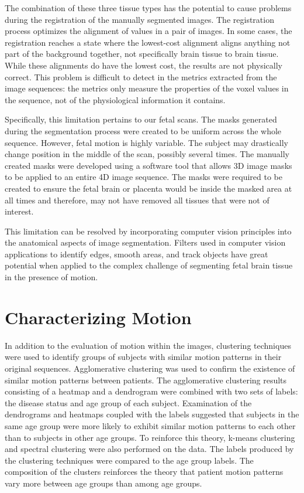 The combination of these three tissue types has the potential to cause problems during the registration of the manually segmented images. The registration process optimizes the alignment of values in a pair of images. In some cases, the registration reaches a state where the lowest-cost alignment aligns anything not part of the background together, not specifically brain tissue to brain tissue. While these alignments do have the lowest cost, the results are not physically correct. This problem is difficult to detect in the metrics extracted from the image sequences: the metrics only measure the properties of the voxel values in the sequence, not of the physiological information it contains. 

Specifically, this limitation pertains to our fetal scans. The masks generated during the segmentation process were created to be uniform across the whole sequence. However, fetal motion is highly variable. The subject may drastically change position in the middle of the scan, possibly several times. The manually created masks were developed using a software tool that allows 3D image masks to be applied to an entire 4D image sequence. The masks were required to be created to ensure the fetal brain or placenta would be inside the masked area at all times and therefore, may not have removed all tissues that were not of interest.

This limitation can be resolved by incorporating computer vision principles into the anatomical aspects of image segmentation. Filters used in computer vision applications to identify edges, smooth areas, and track objects have great potential when applied to the complex challenge of segmenting fetal brain tissue in the presence of motion.

\section{Characterizing Motion}

In addition to the evaluation of motion within the images, clustering techniques were used to identify groups of subjects with similar motion patterns in their original sequences. Agglomerative clustering was used to confirm the existence of similar motion patterns between patients. The agglomerative clustering results consisting of a heatmap and a dendrogram were combined with two sets of labels: the disease status and age group of each subject. Examination of the dendrograms and heatmaps coupled with the labels suggested that subjects in the same age group were more likely to exhibit similar motion patterns to each other than to subjects in other age groups. To reinforce this theory, k-means clustering and spectral clustering were also performed on the data. The labels produced by the clustering techniques were compared to the age group labels. The composition of the clusters reinforces the theory that patient motion patterns vary more between age groups than among age groups.

